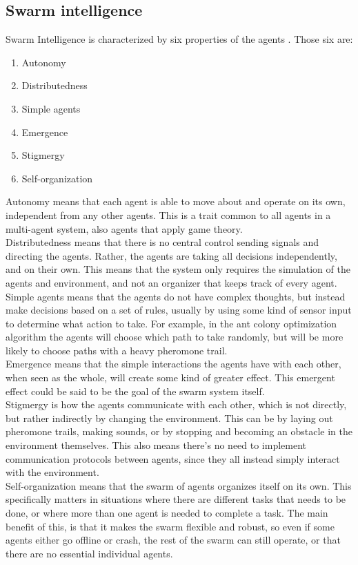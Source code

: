\documentclass[a4paper,english]{report}
\begin{document}
	\subsection{Swarm intelligence}
	Swarm Intelligence is characterized by six properties of the agents \cite{bonabeau1999swarm}. Those six are:
	\begin{enumerate}
		\item Autonomy
		\item Distributedness
		\item Simple agents
		\item Emergence
		\item Stigmergy
		\item Self-organization
	\end{enumerate}
	Autonomy means that each agent is able to move about and operate on its own, independent from any other agents. This is a trait common to all agents in a multi-agent system, also agents that apply game theory.\\
	Distributedness means that there is no central control sending signals and directing the agents. Rather, the agents are taking all decisions independently, and on their own. This means that the system only requires the simulation of the agents and environment, and not an organizer that keeps track of every agent.\\
	Simple agents means that the agents do not have complex thoughts, but instead make decisions based on a set of rules, usually by using some kind of sensor input to determine what action to take. For example, in the ant colony optimization algorithm the agents will choose which path to take randomly, but will be more likely to choose paths with a heavy pheromone trail.\\
	Emergence means that the simple interactions the agents have with each other, when seen as the whole, will create some kind of greater effect. This emergent effect could be said to be the goal of the swarm system itself.\\
	Stigmergy is how the agents communicate with each other, which is not directly, but rather indirectly by changing the environment. This can be by laying out pheromone trails, making sounds, or by stopping and becoming an obstacle in the environment themselves. This also means there's no need to implement communication protocols between agents, since they all instead simply interact with the environment.\\
	Self-organization means that the swarm of agents organizes itself on its own. This specifically matters in situations where there are different tasks that needs to be done, or where more than one agent is needed to complete a task. The main benefit of this, is that it makes the swarm flexible and robust, so even if some agents either go offline or crash, the rest of the swarm can still operate, or that there are no essential individual agents.\\
\end{document}
